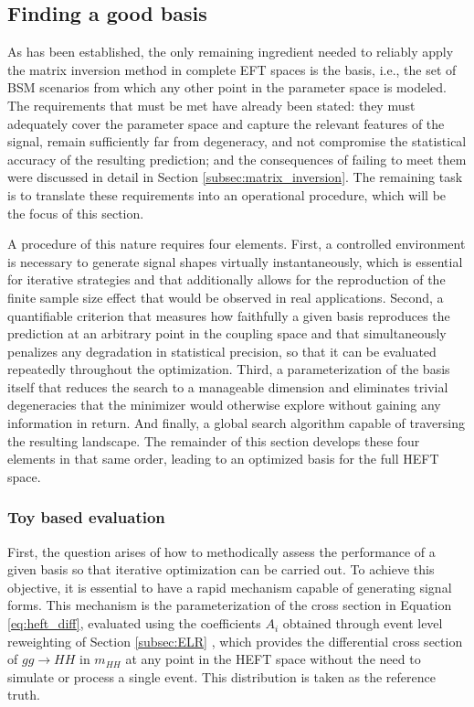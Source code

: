 \subsection{Finding a good basis}
\label{subsec:finding_basis}
As has been established, the only remaining ingredient needed to reliably apply the matrix inversion method in complete EFT spaces is the basis, i.e., the set of BSM scenarios from which any other point in the parameter space is modeled. The requirements that must be met have already been stated: they must adequately cover the parameter space and capture the relevant features of the signal, remain sufficiently far from degeneracy, and not compromise the statistical accuracy of the resulting prediction; and the consequences of failing to meet them were discussed in detail in Section \ref{subsec:matrix_inversion}. The remaining task is to translate these requirements into an operational procedure, which will be the focus of this section.

A procedure of this nature requires four elements. First, a controlled environment is necessary to generate signal shapes virtually instantaneously, which is essential for iterative strategies and that additionally allows for the reproduction of the finite sample size effect that would be observed in real applications. Second, a quantifiable criterion that measures how faithfully a given basis reproduces the prediction at an arbitrary point in the coupling space and that simultaneously penalizes any degradation in statistical precision, so that it can be evaluated repeatedly throughout the optimization. Third, a parameterization of the basis itself that reduces the search to a manageable dimension and eliminates trivial degeneracies that the minimizer would otherwise explore without gaining any information in return. And finally, a global search algorithm capable of traversing the resulting landscape. The remainder of this section develops these four elements in that same order, leading to an optimized basis for the full HEFT space.\medskip

\subsubsection{Toy based evaluation}
\label{subsec:toy_evaluation}
First, the question arises of how to methodically assess the performance of a given basis so that iterative optimization can be carried out. To achieve this objective, it is essential to have a rapid mechanism capable of generating signal forms. This mechanism is the parameterization of the cross section in Equation \ref{eq:heft_diff}, evaluated using the coefficients $A_i$ obtained through event level reweighting of Section \ref{subsec:ELR} \cite{HHReweighting}, which provides the differential cross section of $gg\to HH$ in $m_{HH}$ at any point in the HEFT space without the need to simulate or process a single event. This distribution is taken as the reference truth.

